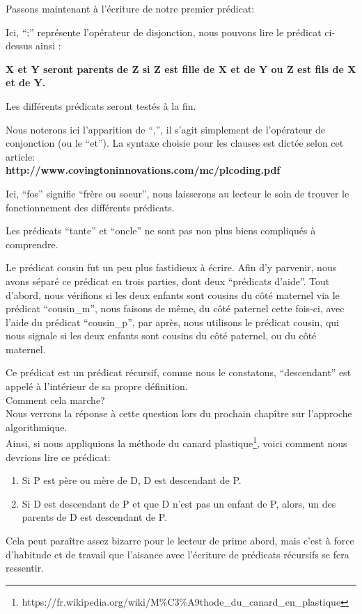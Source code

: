 \documentclass[a4paper, 12pt]{article}
\numberwithin{equation}{subsection}
\begin{document}
Passons maintenant à l'écriture de notre premier prédicat:

Ici, ``;'' représente l'opérateur de disjonction, nous pouvons lire le prédicat ci-dessus ainsi :
\begin{center}
  {\bf X et Y seront parents de Z si Z est fille de X et de Y ou Z est fils de X et de Y.}
\end{center}
Les différents prédicats seront testés à la fin.

Nous noterons ici l'apparition de ``,'', il s'agit simplement de l'opérateur de conjonction (ou le ``et''). La syntaxe choisie pour les clauses est dictée selon cet article: \\
{\bf http://www.covingtoninnovations.com/mc/plcoding.pdf}

Ici, ``fos'' signifie ``frère ou soeur'', nous laisserons au lecteur le soin de trouver le fonctionnement des différents prédicats.

Les prédicats ``tante'' et ``oncle'' ne sont pas non plus biens compliqués à comprendre.

Le prédicat cousin fut un peu plus fastidieux à écrire. Afin d'y parvenir, nous avons séparé ce prédicat en trois parties, dont deux ``prédicats d'aide''. Tout d'abord, nous vérifions si les deux enfants sont cousins du côté maternel via le prédicat ``cousin\_m'', nous faisons de même, du côté paternel cette fois-ci, avec l'aide du prédicat ``cousin\_p'', par après, nous utilisons le prédicat cousin, qui nous signale si les deux enfants sont cousins du côté paternel, ou du côté maternel.

Ce prédicat est un prédicat récursif, comme nous le constatons, ``descendant'' est appelé à l'intérieur de sa propre définition. \\ Comment cela marche? \\
Nous verrons la réponse à cette question lors du prochain chapître sur l'approche algorithmique. \\

Ainsi, si nous appliquions la méthode du canard plastique\footnote{https://fr.wikipedia.org/wiki/M\%C3\%A9thode\_du\_canard\_en\_plastique}, voici comment nous devrions lire ce prédicat: \\
\begin{enumerate}
  \item Si P est père ou mère de D, D est descendant de P.
  \item Si D est descendant de P et que D n'est pas un enfant de P, alors, un des parents de D est descendant de P.
\end{enumerate}
Cela peut paraître assez bizarre pour le lecteur de prime abord, mais c'est à force d'habitude et de travail que l'aisance avec l'écriture de prédicats récursifs se fera ressentir.\\
\end{document}
